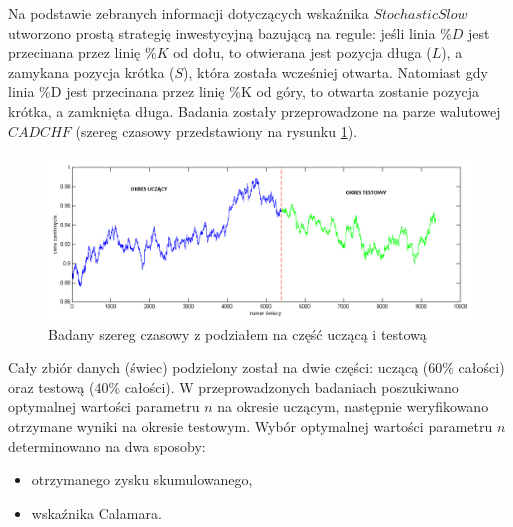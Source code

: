 Na podstawie zebranych informacji dotyczących wskaźnika $Stochastic Slow$ utworzono prostą strategię inwestycyjną bazującą na regule: jeśli linia $\%D$ jest przecinana przez  linię $\%K$ od dołu, to otwierana jest pozycja długa ($L$), a zamykana pozycja krótka ($S$), która została wcześniej otwarta. Natomiast gdy linia \%D jest przecinana przez linię \%K od góry, to otwarta zostanie pozycja krótka, a zamknięta długa. Badania zostały przeprowadzone na parze walutowej $CADCHF$ (szereg czasowy przedstawiony na rysunku \ref{rys2}). \\
\begin{figure}[h!]
\centering
\includegraphics[width = \textwidth]{szereg.png}
\caption{Badany szereg czasowy z podziałem na część uczącą i testową}
\label{rys2}
\end{figure}
\FloatBarrier
Cały zbiór danych (świec) podzielony został na dwie części: uczącą ($60\%$ całości) oraz testową ($40\%$ całości). W przeprowadzonych badaniach poszukiwano optymalnej wartości parametru $n$ na okresie uczącym, następnie weryfikowano otrzymane wyniki na okresie testowym. Wybór optymalnej wartości parametru $n$ determinowano na dwa sposoby:
\begin{itemize}
\item otrzymanego zysku skumulowanego,
\item wskaźnika Calamara.
\end{itemize}

